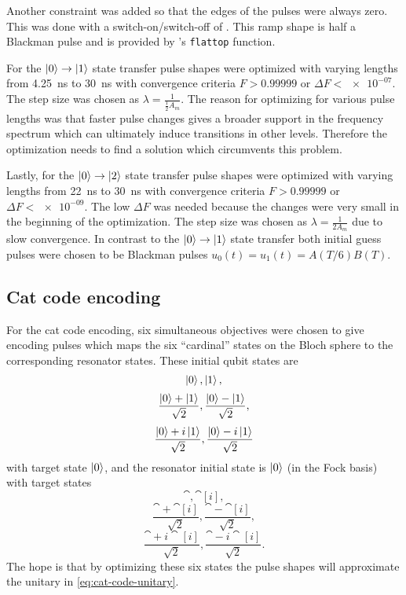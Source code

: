 \documentclass[main.tex]{subfiles}
\begin{document}
Another constraint was added so that the edges of the pulses were always zero.
This was done with a switch-on/switch-off of .
This ramp shape is half a Blackman pulse and is provided by \krotov{}'s \texttt{flattop} function.

For the \(\ket{0}\rightarrow\ket{1}\) state transfer pulse shapes were optimized with varying lengths from \SI{4.25}{\nano\second} to \SI{30}{\nano\second} with convergence criteria \(F>0.99999\) or \(\Delta F < \num{e-07}\).
The step size was chosen as \(\lambda = \frac{1}{\frac{1}{2}A_{m}}\).
The reason for optimizing for various pulse lengths was that faster pulse changes gives a broader support in the frequency spectrum which can ultimately induce transitions in other levels.
Therefore the optimization needs to find a solution which circumvents this problem.

Lastly, for the \(\ket{0}\rightarrow\ket{2}\) state transfer pulse shapes were optimized with varying lengths from \SI{22}{\nano\second} to \SI{30}{\nano\second} with convergence criteria \(F>0.99999\) or \(\Delta F < \num{e-09}\).
The low \(\Delta F\) was needed because the changes were very small in the beginning of the optimization.
The step size was chosen as \(\lambda = \frac{1}{2A_{m}}\) due to slow convergence.
In contrast to the \(\ket{0}\rightarrow\ket{1}\) state transfer both initial guess pulses were chosen to be Blackman pulses \(u_0(t) = u_1(t) = A(T/6)B(T)\).

\subsection{Cat code encoding}
For the cat code encoding, six simultaneous objectives were chosen to give encoding pulses which maps the six ``cardinal'' states on the Bloch sphere to the corresponding resonator states.
These initial qubit states are
\[ \ket{0}, \ket{1},\]
\[ \frac{\ket{0}+\ket{1}}{\sqrt{2}}, \frac{\ket{0}-\ket{1}}{\sqrt{2}},\]
\[ \frac{\ket{0}+i\ket{1}}{\sqrt{2}}, \frac{\ket{0}-i\ket{1}}{\sqrt{2}} \]
with target state \(\ket{0}\),
and the resonator initial state is \(\ket{0}\) (in the Fock basis) with target states
\[ \cat{}, \cat[i]{},\]
\[ \frac{\cat{}+\cat[i]{}}{\sqrt{2}}, \frac{\cat{}-\cat[i]{}}{\sqrt{2}},\]
\[ \frac{\cat{}+i\cat[i]{}}{\sqrt{2}}, \frac{\cat{}-i\cat[i]{}}{\sqrt{2}}. \]
The hope is that by optimizing these six states the pulse shapes will approximate the unitary in \cref{eq:cat-code-unitary}.
\end{document}
